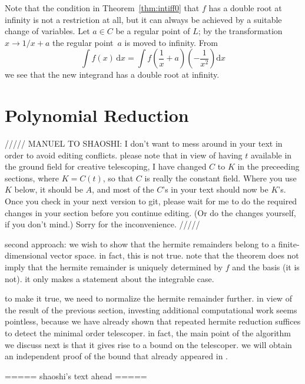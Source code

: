\documentclass{sig-alternate}
\begin{document}
Note that the condition in Theorem~\ref{thm:intiff0} that $f$ has a double
root at infinity is not a restriction at all, but it can always be achieved by
a suitable change of variables.  Let $a\in C$ be a regular point of $L$; by
the transformation $x\to1/x+a$ the regular point~$a$ is moved to
infinity. From
\[
  \int f(x) \,\mathrm{d}x = \int f\left(\frac{1}{x}+a\right)\left(-\frac{1}{x^2}\right) \mathrm{d}x
\]
we see that the new integrand has a double root at infinity.


\section{Polynomial Reduction}\label{sec:polynomial}

///// MANUEL TO SHAOSHI: I don't want to mess around in your text in order to avoid
editing conflicts. please note that in view of having $t$ available in the ground
field for creative telescoping, I have changed $C$ to $K$ in the preceeding sections,
where $K=C(t)$, so that $C$ is really the constant field. Where you use $K$ below,
it should be $A$, and most of the $C$'s in your text should now be $K$'s. Once you
check in your next version to git, please wait for me to do the required changes in
your section before you continue editing. (Or do the changes yourself, if you don't
mind.) Sorry for the inconvenience. /////


second approach: we wish to show that the hermite remainders belong to a finite-dimensional
vector space. in fact, this is not true.
note that the theorem does not imply that the hermite remainder is uniquely determined by
$f$ and the basis (it is not). it only makes a statement about the integrable case.

to make it true, we need to normalize the hermite remainder further. in view of the result
of the previous section, investing additional computational work seems pointless, because we have
already shown that repeated hermite reduction suffices to detect the minimal order telescoper.
in fact, the main point of the algorithm we discuss next is that it gives rise to a bound on
the telescoper. we will obtain an independent proof of the bound that already appeared in \cite{chen14a}.

===== shaoshi's text ahead =====
\end{document}
